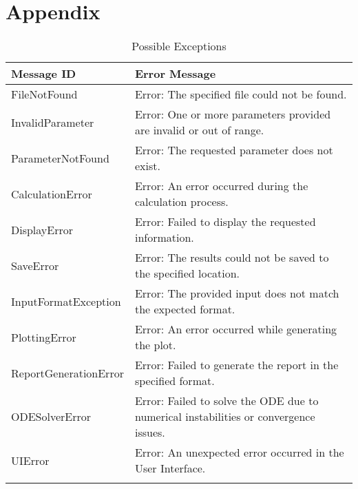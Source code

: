 \documentclass[12pt, titlepage]{article}
\begin{document}
\newpage

\section{Appendix} \label{Appendix}

\begin{longtable}{l p{12cm}}
  \toprule
  \textbf{Message ID} & \textbf{Error Message} \\
  \midrule
  FileNotFound & Error: The specified file could not be found. \\
  InvalidParameter & Error: One or more parameters provided are invalid or out of range. \\
  ParameterNotFound& Error: The requested parameter does not exist.\\
  CalculationError& Error: An error occurred during the calculation process.\\
  DisplayError& Error: Failed to display the requested information.\\
  SaveError& Error: The results could not be saved to the specified location.\\
  InputFormatException& Error: The provided input does not match the expected format.\\
  PlottingError& Error: An error occurred while generating the plot.\\
  ReportGenerationError& Error: Failed to generate the report in the specified format.\\
  ODESolverError& Error: Failed to solve the ODE due to numerical instabilities or convergence issues.\\
  UIError& Error: An unexpected error occurred in the User Interface.\\
  \bottomrule
  \caption{Possible Exceptions} \\
\end{longtable}
\end{document}
